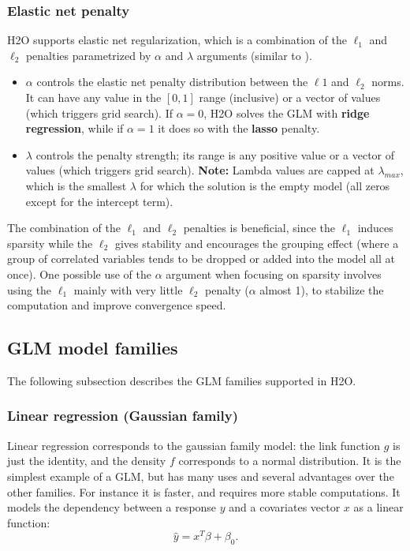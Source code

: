 \subsubsection{Elastic net penalty}

H2O supports elastic net regularization, which is a combination of the $\ell_1$ and $\ell_2$ penalties parametrized by $\alpha$ and $\lambda$ arguments (similar to ).
\begin{itemize}
\item $\alpha$ controls the elastic net penalty distribution between the $\ell1$ and $\ell_2$ norms. It can have any value
in the $[0,1]$ range (inclusive) or a vector of values (which triggers grid search). If $\alpha = 0$, H2O solves the GLM with \textbf{ridge regression}, while if $\alpha = 1$ it does so with the \textbf{lasso} penalty.
\item $\lambda$ controls the penalty strength; its range is any positive value or a vector of values (which triggers grid search). 
\textbf{Note:} Lambda values are capped at $\lambda_{max}$, which is the smallest $\lambda$ for which the solution is
the empty model (all zeros except for the intercept term). %
\end{itemize}


The combination of the $\ell_1$ and $\ell_2$ penalties is beneficial, since the $\ell_1$ induces sparsity while the $\ell_2$ gives
stability and encourages the grouping effect (where a group of correlated variables tends to be dropped or added
into the model all at once). One possible use of the $\alpha$ argument when focusing on sparsity involves using the $\ell_1$ mainly with very little $\ell_2$ penalty
($\alpha$ almost 1), to stabilize the computation and improve convergence speed.


\subsection{GLM model families}
The following subsection describes the GLM families supported in H2O. 

\subsubsection{Linear regression (Gaussian family)}
Linear regression corresponds to the gaussian family model: the link function $g$ is just the identity, and the density $f$ corresponds to a normal distribution. It is the simplest example of a GLM, but has many uses and
several advantages over the other families. For instance it is faster, and requires more stable computations. It models the dependency between a response $y$ and a covariates vector $x$ as a linear function:
$$ \hat{y} = x^T\beta + \beta_0.$$

